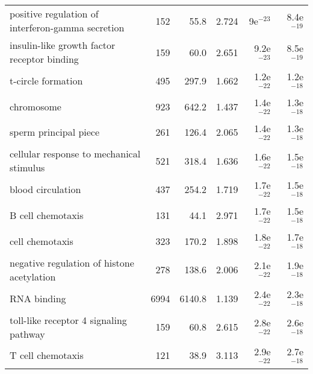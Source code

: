 \begin{longtable}{lrrrrr}
 positive regulation of interferon-gamma secretion &                     152 &                    55.8 &      2.724 &           9e$^{-23}$ &         8.4e$^{-19}$ \\
       insulin-like growth factor receptor binding &                     159 &                    60.0 &      2.651 &         9.2e$^{-23}$ &         8.5e$^{-19}$ \\
                                t-circle formation &                     495 &                   297.9 &      1.662 &         1.2e$^{-22}$ &         1.2e$^{-18}$ \\
                                        chromosome &                     923 &                   642.2 &      1.437 &         1.4e$^{-22}$ &         1.3e$^{-18}$ \\
                             sperm principal piece &                     261 &                   126.4 &      2.065 &         1.4e$^{-22}$ &         1.3e$^{-18}$ \\
          cellular response to mechanical stimulus &                     521 &                   318.4 &      1.636 &         1.6e$^{-22}$ &         1.5e$^{-18}$ \\
                                 blood circulation &                     437 &                   254.2 &      1.719 &         1.7e$^{-22}$ &         1.5e$^{-18}$ \\
                                 B cell chemotaxis &                     131 &                    44.1 &      2.971 &         1.7e$^{-22}$ &         1.5e$^{-18}$ \\
                                   cell chemotaxis &                     323 &                   170.2 &      1.898 &         1.8e$^{-22}$ &         1.7e$^{-18}$ \\
        negative regulation of histone acetylation &                     278 &                   138.6 &      2.006 &         2.1e$^{-22}$ &         1.9e$^{-18}$ \\
                                       RNA binding &                    6994 &                  6140.8 &      1.139 &         2.4e$^{-22}$ &         2.3e$^{-18}$ \\
            toll-like receptor 4 signaling pathway &                     159 &                    60.8 &      2.615 &         2.8e$^{-22}$ &         2.6e$^{-18}$ \\
                                 T cell chemotaxis &                     121 &                    38.9 &      3.113 &         2.9e$^{-22}$ &         2.7e$^{-18}$ \\

\end{longtable}
